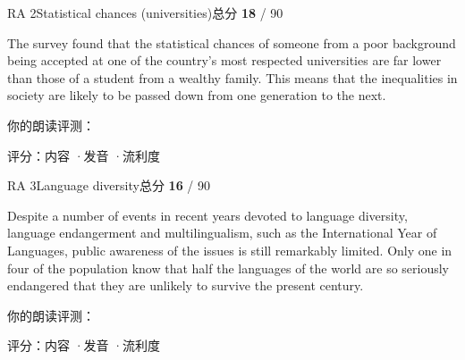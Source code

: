 \begin{qblock}{RA 2\quad Statistical chances (universities)}{总分 \textcolor{cAccent}{\bfseries 18} / 90}
\begin{promptbox}
The survey found that the statistical chances of someone from a poor background being accepted at one of the country's most respected universities are far lower than those of a student from a wealthy family. This means that the inequalities in society are likely to be passed down from one generation to the next.
\end{promptbox}
\smallskip\par{\footnotesize\color{gray}你的朗读评测：}
\begin{asrbox}
 \pse {}   \pse {} \pse {}    \pse {}   \pse {} \pse {} \pse {}  \pse {}
\end{asrbox}
{\small 评分：内容 \quad·\quad 发音 \quad·\quad 流利度 }
\end{qblock}

\begin{qblock}{RA 3\quad Language diversity}{总分 \textcolor{cAccent}{\bfseries 16} / 90}
\begin{promptbox}
Despite a number of events in recent years devoted to language diversity, language endangerment and multilingualism, such as the International Year of Languages, public awareness of the issues is still remarkably limited. Only one in four of the population know that half the languages of the world are so seriously endangered that they are unlikely to survive the present century.
\end{promptbox}
\smallskip\par{\footnotesize\color{gray}你的朗读评测：}
\begin{asrbox}
 \pse {} \pse {} \pse {} \pse {} \pse {} \pse {} \pse {} \pse {}    \pse {} \pse {} \pse {} \pse {}
\end{asrbox}
{\small 评分：内容 \quad·\quad 发音 \quad·\quad 流利度 }
\end{qblock}

